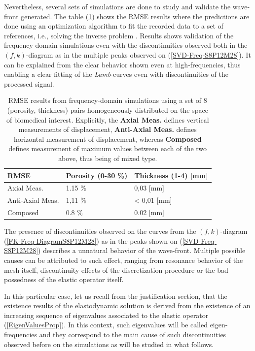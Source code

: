 Nevertheless, several sets of simulations are done to study and validate the wave-front generated. The table (\ref{FreqInvTable}) shows the RMSE results where the predictions are done using an optimization algorithm to fit the recorded data to a set of references, i.e., solving the inverse problem \cite{Minonzio2018}. Results shows validation of the frequency domain simulations even with the discontinuities observed both in the $(f,k)$-diagram as in the multiple peaks observed on (\ref{SVD-Freq-S8P12M28}). It can be explained from the clear behavior shown even at high-frequencies, thus enabling a clear fitting of the \textit{Lamb}-curves even with discontinuities of the processed signal.
\begin{table}[!h]
\centering
    \begin{tabular}{l l l}
    \toprule
    \textbf{RMSE} & \textbf{Porosity} (0-30 \%) & \textbf{Thickness} (1-4) [mm]\\
    \midrule
    Axial Meas. & 1.15 \% & 0,03  [mm]\\
    Anti-Axial Meas. & 1,11 \%  & < 0,01 [mm]\\
    Composed & 0.8 \% & 0.02 [mm] \\
    \bottomrule
    \end{tabular}
    \caption{RMSE results from frequency-domain simulations using a set of 8 (porosity, thickness) pairs homogeneously distributed on the space of biomedical interest. Explicitly, the \textbf{Axial Meas.} defines vertical measurements of displacement, \textbf{Anti-Axial Meas.} defines horizontal measurement of displacement, whereas \textbf{Composed} defines measurement of maximum values between each of the two above, thus being of mixed type.}
    \label{FreqInvTable}
\end{table}

The presence of discontinuities observed on the curves from  the $(f,k)$-diagram (\ref{FK-Freq-DiagramS8P12M28}) as in the peaks shown on (\ref{SVD-Freq-S8P12M28}) describes a unnatural behavior of the wave-front. Multiple possible causes can be attributed to such effect, ranging from resonance behavior of the mesh itself, discontinuity effects of the discretization procedure or the bad-possedness of the elastic operator itself.

In this particular case, let us recall from the justification section, that the existence results of the elastodynamic solution is derived from the existence of an increasing sequence of eigenvalues associated to the elastic operator (\ref{EigenValuesProp}). In this context, such eigenvalues will be called eigen-frequencies and they correspond to the main cause of such discontinuities observed before on the simulations as will be studied in what follows.

